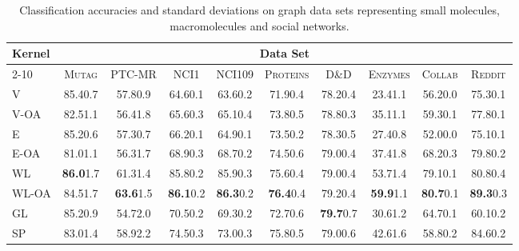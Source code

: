 \documentclass{article}
\begin{document}
\setlength\tabcolsep{3.7pt}
\newcommand{\win}[1]{\textbf{#1}}
\newcommand{\sd}[1]{\scriptsize{#1}}
\begin{table*}\small
\begin{center}
  \caption{Classification accuracies and standard deviations on graph data sets 
  representing small molecules, macromolecules and social networks.}
  \label{tab:accuracies}
  \begin{tabular}{@{}lccccccccc@{}}\toprule
    \multirow{3}{*}{\textbf{Kernel}}    &\multicolumn{9}{c}{\textbf{Data Set}}\\\cmidrule{2-10}
                     & \textsc{Mutag}   & \textsc{PTC-MR}  & \textsc{NCI1}    & \textsc{NCI109}  & \textsc{Proteins} & \textsc{D\&D}    & \textsc{Enzymes}  & \textsc{Collab}  & \textsc{Reddit}  \\\midrule
    \textsc{V}       &  85.4\sd{0.7}    &  57.8\sd{0.9}    &  64.6\sd{0.1}    &  63.6\sd{0.2}    &  71.9\sd{0.4}     &  78.2\sd{0.4}    &  23.4\sd{1.1}     & 56.2\sd{0.0}     & 75.3\sd{0.1}     \\
    \textsc{V-OA}    &  82.5\sd{1.1}    &  56.4\sd{1.8}    &  65.6\sd{0.3}    &  65.1\sd{0.4}    &  73.8\sd{0.5}     &  78.8\sd{0.3}    &  35.1\sd{1.1}     & 59.3\sd{0.1}     & 77.8\sd{0.1}     \\\midrule
    \textsc{E}       &  85.2\sd{0.6}    &  57.3\sd{0.7}    &  66.2\sd{0.1}    &  64.9\sd{0.1}    &  73.5\sd{0.2}     &  78.3\sd{0.5}    &  27.4\sd{0.8}     & 52.0\sd{0.0}     & 75.1\sd{0.1}     \\
    \textsc{E-OA}    &  81.0\sd{1.1}    &  56.3\sd{1.7}    &  68.9\sd{0.3}    &  68.7\sd{0.2}    &  74.5\sd{0.6}     &  79.0\sd{0.4}    &  37.4\sd{1.8}     & 68.2\sd{0.3}     & 79.8\sd{0.2}     \\\midrule 
    \textsc{WL}      &\win{86.0}\sd{1.7}&  61.3\sd{1.4}    &  85.8\sd{0.2}    &  85.9\sd{0.3}    &  75.6\sd{0.4}     &  79.0\sd{0.4}    &  53.7\sd{1.4}     & 79.1\sd{0.1}     & 80.8\sd{0.4}     \\
    \textsc{WL-OA}   &  84.5\sd{1.7}    &\win{63.6}\sd{1.5}&\win{86.1}\sd{0.2}&\win{86.3}\sd{0.2}&\win{76.4}\sd{0.4} &  79.2\sd{0.4}    &\win{59.9}\sd{1.1} &\win{80.7}\sd{0.1}&\win{89.3}\sd{0.3}\\\midrule
    \textsc{GL}      &  85.2\sd{0.9}    &  54.7\sd{2.0}    &  70.5\sd{0.2}    &  69.3\sd{0.2}    &  72.7\sd{0.6}     &\win{79.7}\sd{0.7}&  30.6\sd{1.2}     & 64.7\sd{0.1}     & 60.1\sd{0.2}     \\
    \textsc{SP}      &  83.0\sd{1.4}    &  58.9\sd{2.2}    &  74.5\sd{0.3}    &  73.0\sd{0.3}    &  75.8\sd{0.5}     &  79.0\sd{0.6}    &  42.6\sd{1.6}     & 58.8\sd{0.2}     & 84.6\sd{0.2}     \\
    \bottomrule
  \end{tabular}
\end{center}
\end{table*}
\end{document}
